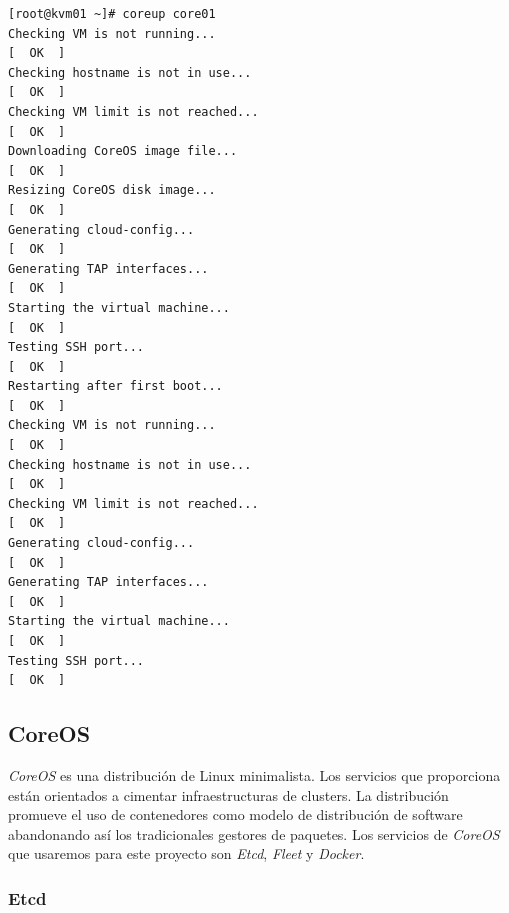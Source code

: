\documentclass[a4paper,12pt,spanish,final]{epsc_tfc_pfc}
\begin{document}
\begin{lstlisting}[style=dnsmasq]
[root@kvm01 ~]# coreup core01
Checking VM is not running...                                                           [  OK  ]
Checking hostname is not in use...                                                      [  OK  ]
Checking VM limit is not reached...                                                     [  OK  ]
Downloading CoreOS image file...                                                        [  OK  ]
Resizing CoreOS disk image...                                                           [  OK  ]
Generating cloud-config...                                                              [  OK  ]
Generating TAP interfaces...                                                            [  OK  ]
Starting the virtual machine...                                                         [  OK  ]
Testing SSH port...                                                                     [  OK  ]
Restarting after first boot...                                                          [  OK  ]
Checking VM is not running...                                                           [  OK  ]
Checking hostname is not in use...                                                      [  OK  ]
Checking VM limit is not reached...                                                     [  OK  ]
Generating cloud-config...                                                              [  OK  ]
Generating TAP interfaces...                                                            [  OK  ]
Starting the virtual machine...                                                         [  OK  ]
Testing SSH port...                                                                     [  OK  ]
\end{lstlisting}

\subsection{CoreOS}

\emph{CoreOS} es una distribución de Linux minimalista. Los servicios que proporciona están orientados a cimentar infraestructuras de clusters. La distribución promueve el uso de contenedores como modelo de distribución de software abandonando así los tradicionales gestores de paquetes. Los servicios de \emph{CoreOS} que usaremos para este proyecto son \emph{Etcd}, \emph{Fleet} y \emph{Docker}.

\subsubsection{Etcd}
\end{document}
